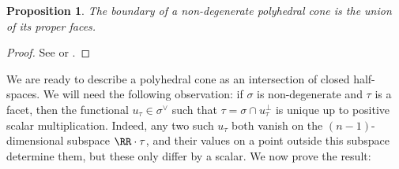 \documentclass[12pt]{amsart}
\theoremstyle{plain}
\newtheorem{proposition}[theorem]{Proposition}
\begin{document}
\begin{proposition}\label{proposition:boundary}
The boundary of a non-degenerate polyhedral cone is the union of its proper faces.
\end{proposition}
\begin{proof}
See \cite[\S 1.2]{Fulton93} or \cite[\S 1]{Zaman13}.
\end{proof}

%

We are ready to describe a polyhedral cone as an intersection of closed half-spaces.
We will need the following observation:
if $\sigma$ is non-degenerate and $\tau$ is a facet, then the functional $u_\tau \in \sigma^\vee$ such that $\tau = \sigma \cap u_\tau^\perp$ is unique up to positive scalar multiplication.
Indeed, any two such $u_\tau$ both vanish on the $(n-1)$-dimensional subspace $\RR \cdot \tau$, and their values on a point outside this subspace determine them, but these only differ by a scalar.
We now prove the result:
\end{document}
